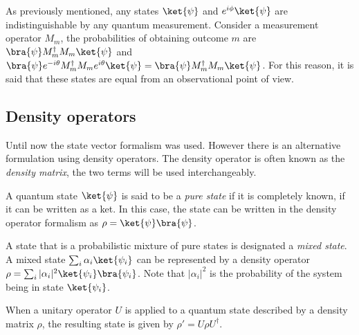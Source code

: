 As previously mentioned, any states $\ket{\psi}$ and $e^{i\phi}\ket{\psi}$ are indistinguishable by any quantum measurement. Consider a measurement operator $M_m$, the probabilities of obtaining outcome $m$ are $\bra{\psi} M_{m}^{\dagger}M_{m}\ket{\psi}$ and $\bra{\psi} e^{-i \theta} M_{m}^{\dagger}M_{m}e^{i\theta}\ket{\psi}=\bra{\psi} M_{m}^{\dagger}M_{m}\ket{\psi}$. For this reason, it is said that these states are equal from an observational point of view.




\subsection{Density operators}
Until now the state vector formalism was used. However there is an alternative formulation using density operators. The density operator is often known as the \emph{density matrix}, the two terms will be used interchangeably.


\begin{definition}
A quantum state $\ket{\psi}$ is said to be a \emph{pure state} if it is completely known, \ie if it can be written as a ket. In this case, the state can be written in the density operator formalism as $\rho = \ket{\psi}\bra{\psi}$. 
\end{definition}

\begin{definition}
A state that is a probabilistic mixture of pure states is designated a \emph{mixed state}. A mixed state $\sum_i \alpha_i \ket{\psi_i}$ can be represented by a density operator $\rho= \sum_i |\alpha_i|^{2}\ket{\psi_i}\bra{\psi_i}$. Note that $|\alpha_i|^{2}$ is the probability of the system being in state $\ket{\psi_i}$.
\end{definition} 

\begin{definition}
  When a unitary operator \( U \) is applied to a quantum state described by a density matrix \( \rho \), the resulting state is given by $ \rho' = U \rho U^\dagger.$
\end{definition}

